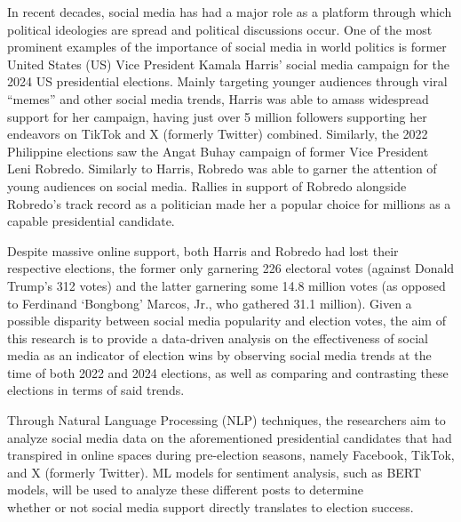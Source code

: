 \begin{thesisabstract}
    In recent decades, social media has had a major role as a platform through which political ideologies are spread and political discussions occur. One of the most prominent examples of the importance of social media in world politics is former United States (US) Vice President Kamala Harris’ social media campaign for the 2024 US presidential elections. Mainly targeting younger audiences through viral “memes” and other social media trends, Harris was able to amass widespread support for her campaign, having just over 5 million followers supporting her endeavors on TikTok and X (formerly Twitter) combined.\cite{CTX_Lee-2024} Similarly, the 2022 Philippine elections saw the Angat Buhay campaign of former Vice President Leni Robredo. Similarly to Harris, Robredo was able to garner the attention of young audiences on social media. Rallies in support of Robredo alongside Robredo’s track record as a politician made her a popular choice for millions as a capable presidential candidate.\cite{CTX_Johnson-2022}  

Despite massive online support, both Harris and Robredo had lost their respective elections, the former only garnering 226 electoral votes (against Donald Trump’s 312 votes) and the latter garnering some 14.8 million votes (as opposed to Ferdinand ‘Bongbong’ Marcos, Jr., who gathered 31.1 million).\cite{CTX_ABSCBN-2022,CTX_BBC-2024} Given a possible disparity between social media popularity and election votes, the aim of this research is to provide a data-driven analysis on the effectiveness of social media as an indicator of election wins by observing social media trends at the time of both 2022 and 2024 elections, as well as comparing and contrasting these elections in terms of said trends.
    
Through Natural Language Processing (NLP) techniques, the researchers aim to analyze social media data on the aforementioned presidential candidates that had transpired in online spaces during pre-election seasons, namely Facebook, TikTok, and X (formerly Twitter). ML models for sentiment analysis, such as BERT models, will be used to analyze these different posts to determine \\whether or not social media support directly translates to election success.
\end{thesisabstract}